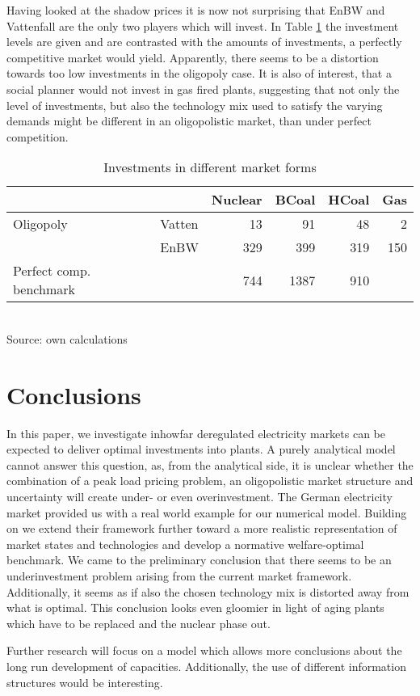 Having looked at the shadow prices it is now not surprising that EnBW and Vattenfall are the only two players which will invest. In Table \ref{tab:invest} the investment levels are given and are contrasted with the amounts of investments, a perfectly competitive market would yield. Apparently, there seems to be a distortion towards too low investments in the oligopoly case. It is also of interest, that a social planner would not invest in gas fired plants, suggesting that not only the level of investments, but also the technology mix used to satisfy the varying demands might be different in an oligopolistic market, than under perfect competition.

\begin{table}[htb]
\centering
\caption{Investments in different market forms}
\vspace{0.3cm}
\begin{tabular}{llrrrr}
\hline
           &            &    Nuclear &      BCoal &      HCoal &        Gas \\

\hline
 Oligopoly &     Vatten &         13 &         91 &         48 &          2 \\

           &       EnBW &        329 &        399 &        319 &        150 \\

\hline
 Perfect comp. benchmark &            &        744 &       1387 &        910 &            \\
\hline
\end{tabular}  
\label{tab:invest}
\\
\vspace{0.3cm}
\scriptsize Source: own calculations
\end{table}

\section{Conclusions}

In this paper, we investigate inhowfar deregulated electricity markets can be expected to deliver optimal investments into plants. A purely analytical model cannot answer this question, as, from the analytical side, it is unclear whether the combination of a peak load pricing problem, an oligopolistic market structure and uncertainty will create under- or even overinvestment. The German electricity market provided us with a real world example for our numerical model. Building on \cite{Genc2007} we extend their framework further toward a more realistic representation of market states and technologies and develop a normative welfare-optimal benchmark. We came to the preliminary conclusion that there seems to be an underinvestment problem arising from the current market framework. Additionally, it seems as if also the chosen technology mix is distorted away from what is optimal. This conclusion looks even gloomier in light of aging plants which have to be replaced and the nuclear phase out.

Further research will focus on a model which allows more conclusions about the long run development of capacities. Additionally, the use of different information structures would be interesting.



 
